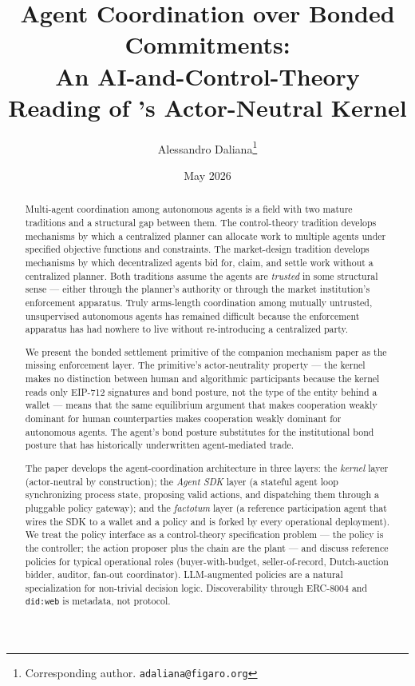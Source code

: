 \documentclass[11pt,a4paper]{article}
\title{%
  Agent Coordination over Bonded Commitments:\\
  An AI-and-Control-Theory Reading of \figaro{}'s Actor-Neutral Kernel%
}
\author{
  Alessandro Daliana\thanks{Corresponding author. \texttt{adaliana@figaro.org}}
}
\date{May 2026}
\theoremstyle{definition}
\theoremstyle{remark}
\begin{document}
\maketitle

\begin{abstract}
Multi-agent coordination among autonomous agents is a field with two
mature traditions and a structural gap between them. The control-theory
tradition develops mechanisms by which a centralized planner can
allocate work to multiple agents under specified objective functions
and constraints. The market-design tradition develops mechanisms by
which decentralized agents bid for, claim, and settle work without a
centralized planner. Both traditions assume the agents are
\emph{trusted} in some structural sense --- either through the planner's
authority or through the market institution's enforcement apparatus.
Truly arms-length coordination among mutually untrusted, unsupervised
autonomous agents has remained difficult because the enforcement
apparatus has had nowhere to live without re-introducing a centralized
party.

We present the bonded settlement primitive of the companion mechanism
paper as the missing enforcement layer. The primitive's actor-neutrality
property --- the kernel makes no distinction between human and
algorithmic participants because the kernel reads only EIP-712
signatures and bond posture, not the type of the entity behind a
wallet --- means that the same equilibrium argument that makes
cooperation weakly dominant for human counterparties makes cooperation
weakly dominant for autonomous agents. The agent's bond posture
substitutes for the institutional bond posture that has historically
underwritten agent-mediated trade.

The paper develops the agent-coordination architecture in three
layers: the \emph{kernel} layer (actor-neutral by construction); the
\emph{Agent SDK} layer (a stateful agent loop synchronizing process
state, proposing valid actions, and dispatching them through a
pluggable policy gateway); and the \emph{factotum} layer (a reference
participation agent that wires the SDK to a wallet and a policy and is
forked by every operational deployment). We treat the policy interface
as a control-theory specification problem --- the policy is the
controller; the action proposer plus the chain are the plant ---
and discuss reference policies for typical operational roles
(buyer-with-budget, seller-of-record, Dutch-auction bidder, auditor,
fan-out coordinator). LLM-augmented policies are a natural
specialization for non-trivial decision logic. Discoverability through
ERC-8004 and \texttt{did:web} is metadata, not protocol.
\end{abstract}
\end{document}
